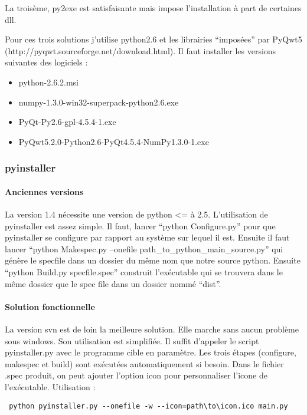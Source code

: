 \documentclass[12pt,a4paper]{article}
\begin{document}
        La troisème, py2exe est satisfaisante mais impose l'installation à part
        de certaines dll.\newline

        Pour ces trois solutions j'utilise python2.6 et les librairies
        ``impos\'ees'' par PyQwt5 (http://pyqwt.sourceforge.net/download.html).
        Il faut installer les versions suivantes des logiciels :
        \begin{itemize}
            \item python-2.6.2.msi
            \item numpy-1.3.0-win32-superpack-python2.6.exe
            \item PyQt-Py2.6-gpl-4.5.4-1.exe
            \item PyQwt5.2.0-Python2.6-PyQt4.5.4-NumPy1.3.0-1.exe
        \end{itemize}

        \subsubsection{pyinstaller}

        \paragraph{Anciennes versions}

        La version 1.4 nécessite une version de python <= à 2.5. L'utilisation
        de pyinstaller est assez simple. Il faut, lancer ``python Configure.py''
        pour que pyinstaller se configure par rapport au système sur lequel il
        est. Ensuite il faut lancer ``python Makespec.py --onefile
        path\_to\_python\_main\_source.py'' qui génère le specfile dans un
        dossier du même nom que notre source python. Ensuite ``python Build.py
        specfile.spec'' construit l'exécutable qui se trouvera dans le même
        dossier que le spec file dans un dossier nommé ``dist''.

        \paragraph{Solution fonctionnelle}

        La version svn est de loin la meilleure solution. Elle marche sans aucun
        problème sous windows. Son utilisation est simplifi\'ee.  Il suffit
        d'appeler le script pyinstaller.py avec le programme cible en paramètre.
        Les trois \'etapes (configure, makespec et build) sont ex\'ecut\'ees
        automatiquement si besoin. Dans le fichier .spec produit, on peut
        ajouter l'option icon pour personnaliser l'icone de l'ex\'ecutable.
		Utilisation : \begin{verbatim} python pyinstaller.py --onefile -w --icon=path\to\icon.ico main.py \end{verbatim}
\end{document}
